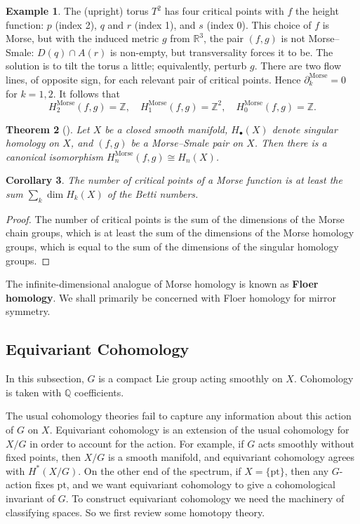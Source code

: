 \documentclass{report}
\theoremstyle{plain}
\newtheorem{theorem}{Theorem}[section]
\newtheorem{corollary}[theorem]{Corollary}
\theoremstyle{definition}
\newtheorem{example}[theorem]{Example}
\theoremstyle{remark}
\newcommand{\di}{\partial}
\newcommand{\bQ}{\mathbb{Q}}
\newcommand{\bR}{\mathbb{R}}
\newcommand{\bZ}{\mathbb{Z}}
\newcommand{\Morse}{\mathrm{Morse}}
\newcommand{\pt}{\mathrm{pt}}
\begin{document}
\begin{example}
  The (upright) torus $T^2$ has four critical points with $f$ the
  height function: $p$ (index 2), $q$ and $r$ (index 1), and $s$
  (index 0). This choice of $f$ is Morse, but with the induced metric
  $g$ from $\bR^3$, the pair $(f, g)$ is not Morse--Smale: $D(q) \cap
  A(r)$ is non-empty, but transversality forces it to be. The solution
  is to tilt the torus a little; equivalently, perturb $g$. There are
  two flow lines, of opposite sign, for each relevant pair of critical
  points. Hence $\di_k^\Morse = 0$ for $k = 1, 2$. It follows that
  \[ H_2^\Morse(f, g) = \bZ, \quad H_1^\Morse(f,g) = \bZ^2, \quad H_0^\Morse(f, g) = \bZ. \]
\end{example}

\begin{theorem}[{\cite[Theorem 3.1]{Hutchings2012}}] \label{thm:morse-homology-iso}
  Let $X$ be a closed smooth manifold, $H_\bullet(X)$ denote singular
  homology on $X$, and $(f, g)$ be a Morse--Smale pair on $X$. Then
  there is a canonical isomorphism $H_n^\Morse(f, g) \cong H_n(X)$.
\end{theorem}

\begin{corollary}
  The number of critical points of a Morse function is at least the
  sum $\sum_k \dim H_k(X)$ of the Betti numbers.
\end{corollary}

\begin{proof}
  The number of critical points is the sum of the dimensions of the
  Morse chain groups, which is at least the sum of the dimensions of
  the Morse homology groups, which is equal to the sum of the
  dimensions of the singular homology groups.
\end{proof}

The infinite-dimensional analogue of Morse homology is known as {\bf
  Floer homology}. We shall primarily be concerned with Floer homology
for mirror symmetry.

\subsection{Equivariant Cohomology}

In this subsection, $G$ is a compact Lie group acting smoothly on $X$.
Cohomology is taken with $\bQ$ coefficients.

The usual cohomology theories fail to capture any information about
this action of $G$ on $X$. Equivariant cohomology is an extension of
the usual cohomology for $X/G$ in order to account for the action. For
example, if $G$ acts smoothly without fixed points, then $X/G$ is a
smooth manifold, and equivariant cohomology agrees with $H^*(X/G)$. On
the other end of the spectrum, if $X = \{\pt\}$, then any $G$-action
fixes $\pt$, and we want equivariant cohomology to give a
cohomological invariant of $G$. To construct equivariant cohomology we
need the machinery of classifying spaces. So we first review some
homotopy theory.
\end{document}
